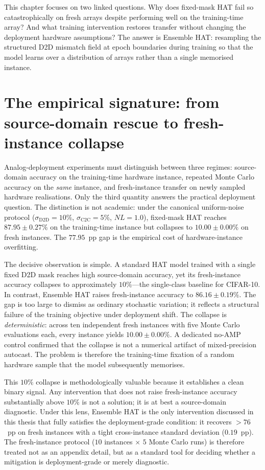 This chapter focuses on two linked questions.  Why does fixed-mask HAT fail so catastrophically on fresh arrays despite performing well on the training-time array?  And what training intervention restores transfer without changing the deployment hardware assumptions?  The answer is Ensemble HAT: resampling the structured D2D mismatch field at epoch boundaries during training so that the model learns over a distribution of arrays rather than a single memorised instance.


\section{The empirical signature: from source-domain rescue to fresh-instance collapse}
\label{sec:ch1-empirical-signature}

Analog-deployment experiments must distinguish between three regimes: source-domain accuracy on the training-time hardware instance, repeated Monte Carlo accuracy on the \emph{same} instance, and fresh-instance transfer on newly sampled hardware realisations.  Only the third quantity answers the practical deployment question.  The distinction is not academic: under the canonical uniform-noise protocol ($\sigma_{\mathrm{D2D}}=10\%$, $\sigma_{\mathrm{C2C}}=5\%$, $NL=1.0$), fixed-mask HAT reaches $87.95\pm0.27\%$ on the training-time instance but collapses to $10.00\pm0.00\%$ on fresh instances.  The $77.95$~pp gap is the empirical cost of hardware-instance overfitting.

The decisive observation is simple.  A standard HAT model trained with a single fixed D2D mask reaches high source-domain accuracy, yet its fresh-instance accuracy collapses to approximately $10\%$---the single-class baseline for CIFAR-10.  In contrast, Ensemble HAT raises fresh-instance accuracy to $86.16\pm0.19\%$.  The gap is too large to dismiss as ordinary stochastic variation; it reflects a structural failure of the training objective under deployment shift.  The collapse is \emph{deterministic}: across ten independent fresh instances with five Monte Carlo evaluations each, every instance yields $10.00\pm0.00\%$.  A dedicated no-AMP control confirmed that the collapse is not a numerical artifact of mixed-precision autocast.  The problem is therefore the training-time fixation of a random hardware sample that the model subsequently memorises.

This $10\%$ collapse is methodologically valuable because it establishes a clean binary signal.  Any intervention that does not raise fresh-instance accuracy substantially above $10\%$ is not a solution; it is at best a source-domain diagnostic.  Under this lens, Ensemble HAT is the only intervention discussed in this thesis that fully satisfies the deployment-grade condition: it recovers $>76$~pp on fresh instances with a tight cross-instance standard deviation ($0.19$~pp).  The fresh-instance protocol ($10$ instances $\times$ $5$ Monte Carlo runs) is therefore treated not as an appendix detail, but as a standard tool for deciding whether a mitigation is deployment-grade or merely diagnostic.


